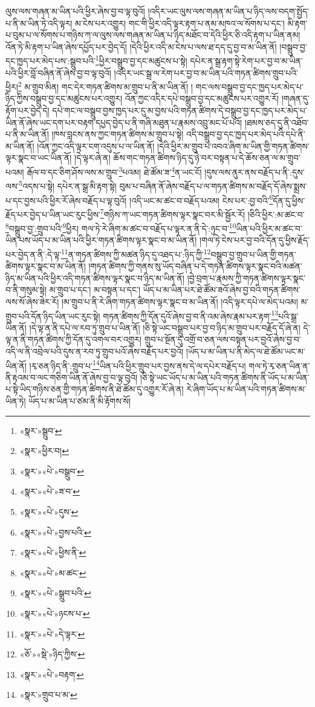 ལུས་ལས་གཞན་མ་ཡིན་པའི་ཕྱིར་ཞེས་བྱ་བ་ལྟ་བུའོ། །འདིར་ཡང་ལུས་ལས་གཞན་མ་ཡིན་པ་ཉིད་ལས་བདག་སྤྱོད་པ་ནི་མ་ཡིན་ཏེ་འདི་ལྟར། མ་ངེས་པར་འགྱུར། གང་གི་ཕྱིར་འདི་ལྟར་རྟག་པ་ནམ་མཁའ་ལ་སོགས་པ་དང་། མི་རྟག་པ་བུམ་པ་ལ་སོགས་པ་གཉིས་ཀ་ལ་ལུས་ལས་གཞན་མ་ཡིན་པ་ཉིད་མཐོང་བ་དེའི་ཕྱིར་ཅི་འདི་རྟག་པ་ཡིན་ནམ། འོན་ཏེ་མི་རྟག་པ་ཡིན་ཞེས་དཔྱོད་པར་བྱེད་དོ། །དེའི་ཕྱིར་འདི་མ་ངེས་པ་ལས་ཐ་དད་དུ་བྱ་བ་མ་ཡིན་ནོ། །བསྒྲུབ་བྱ་དང་ཁྱད་པར་མེད་པས་:སྒྲུབ་པའི་\footnote{«སྣར་»སྒྲུབ་}ཕྱིར་བསྒྲུབ་བྱ་དང་མཚུངས་པ་སྟེ། དཔེར་ན་སྒྲ་རྟག་སྟེ་རེག་པར་བྱ་བ་མ་ཡིན་པའི་ཕྱིར་བློ་བཞིན་ནོ་ཞེས་བྱ་བ་ལྟ་བུའོ། །འདིར་ཡང་སྒྲ་ལ་རེག་པར་བྱ་བ་མ་ཡིན་པའི་གཏན་ཚིགས་གྲུབ་པའི་ཕྱིར།\footnote{«སྣར་»ཕྱིར་བ།} མ་གྲུབ་མིན། གང་དེར་གཏན་ཚིགས་མ་གྲུབ་པ་ནི་མ་ཡིན་ནོ། །
གང་ལས་བསྒྲུབ་བྱ་དང་ཁྱད་པར་མེད་པ་ཉིད་ཀྱིས་བསྒྲུབ་བྱ་དང་མཚུངས་པར་འགྱུར། འོན་ཀྱང་འདིར་དཔེ་བསྒྲུབ་བྱ་དང་མཚུངས་པར་འགྱུར་རོ། །གཞན་དུ་རྟོག་པར་བྱེད་དེ། དཔེ་གང་ལ་བསྒྲུབ་བྱས་ཁྱད་པར་དུ་མ་བྱས་པའི་གཏན་ཚིགས་དེ་བསྒྲུབ་བྱ་དང་ཁྱད་པར་མེད་པ་ཡིན་ནོ་ཞེས་ཡང་དག་པར་བརྟག་དཔྱད་བྱེད་པ་ནི་གཞི་མཐུན་པ་རྣམས་འབྲུ་མང་པོ་པའོ། །ཐམས་ཅད་དུ་ནི་འཐོབ་པ་ནི་མ་ཡིན་ནོ། །ཁས་བླངས་ནས་ཀྱང་གཏན་ཚིགས་མ་གྲུབ་པ་སྟེ། འདི་བསྒྲུབ་བྱ་དང་ཁྱད་པར་མེད་པའི་དཔེ་ནི་མ་ཡིན་ནོ། །འོན་ཀྱང་འདི་ལྟར་ངག་འདུས་པ་ལ་ཡིན་ནོ། །དེའི་ཕྱིར་མ་གྲུབ་པ་འབའ་ཞིག་མ་ཡིན་གྱི་གཏན་ཚིགས་ལྟར་སྣང་བ་ཡང་ཡིན་ནོ། །དེ་ལྟར་ཞེ་ན། ཆོས་གང་གཏན་ཚིགས་ཉིད་དུ་ཉེ་བར་བསྟན་པ་དེ་ཆོས་ཅན་ལ་མ་གྲུབ་པའམ། རྒོལ་བ་དང་ཅིག་ཤོས་ལས་མ་གྲུབ་\footnote{«སྣར་»«པེ་»བསྒྲུབ་}པའམ། ཐེ་ཚོམ་ཟ་\footnote{«སྣར་»«པེ་»ཟ་བ་}ན་ཡང་ངོ། །དུས་ལས་ནུར་ནས་བརྗོད་པ་ནི་:དུས་ལས་\footnote{«སྣར་»«པེ་»དུས་}འདས་པ་སྟེ། དཔེར་ན་སྒྲ་མི་རྟག་སྟེ། བུམ་པ་བཞིན་ནོ་ཞེས་བརྗོད་པ་ལ་གཏན་ཚིགས་མ་བརྗོད་དོ་ཞེས་སྨྲས་པ་དང་བྱས་པའི་ཕྱིར་རོ་ཞེས་བརྗོད་པ་ལྟ་བུའོ། །འདི་ཡང་མ་ཚང་བ་བརྗོད་པའམ། ངེས་པར་:བྱ་བའི་\footnote{«སྣར་»«པེ་»བྱས་པའི་}དོན་དུ་ཕྱིས་རྗོད་པར་བྱེད་པ་ཡིན་ཡང་རུང་ཕྱིས་\footnote{«སྣར་»«པེ་»ཕྱིས་ནི་}གཉིས་ཀ་ཡང་གཏན་ཚིགས་ལྟར་སྣང་བར་མི་སྦྱོར་རོ། །ཅིའི་ཕྱིར་:མ་ཚང་བ་\footnote{«སྣར་»«པེ་»མ་ཚང་}བསྒྲུབ་བྱ་:གྲུབ་པའི་\footnote{«སྣར་»«པེ་»སྒྲུབ་པའི་}ཕྱིར། གལ་ཏེ་རེ་ཞིག་མ་ཚང་བ་བརྗོད་པ་ལྟར་ན་ནི་དེ་:ཉུང་བ་\footnote{«སྣར་»«པེ་»ཉངས་པ་}ཡིན་པའི་ཕྱིར་མ་ཚང་བ་ཡིན་པས་ཡོད་པ་མ་ཡིན་པའི་ཕྱིར་གཏན་ཚིགས་ལྟར་སྣང་བ་མ་ཡིན་ནོ། །གལ་ཏེ་ངེས་པར་བྱ་བའི་དོན་དུ་ཕྱིས་རྗོད་པར་བྱེད་ན་ནི་:དེ་ལྟ་\footnote{«སྣར་»«པེ་»དེ་ལྟར་}ན་གཏན་ཚིགས་ཀྱི་མཚན་ཉིད་དུ་འཐད་པ་:ཉིད་ཀྱི་\footnote{«ཅོ་»«སྡེ་»ཉིད་ཀྱིས་}བསྒྲུབ་བྱ་གྲུབ་པ་ཡིན་གྱི་གཏན་ཚིགས་ལྟར་སྣང་བ་མ་ཡིན་ནོ། །གཏན་ཚིགས་ཀྱི་གནས་སུ་ཡོད་བཞིན་པ་དེ་གཏན་ཚིགས་ལྟར་སྣང་བའི་མཚན་ཉིད་མ་ཡིན་པའི་ཕྱིར་འདི་གཏན་ཚིགས་ལྟར་སྣང་བ་ཉིད་མ་ཡིན་ནོ། །བྱེ་བྲག་པ་རྣམས་ཀྱི་གཏན་ཚིགས་ལྟར་སྣང་བ་ནི་གསུམ་སྟེ། མ་གྲུབ་པ་དང་། མ་བསྟན་པ་དང་། ཡོད་པ་མ་ཡིན་པར་ཐེ་ཚོམ་ཟའོ་ཞེས་བྱ་བའི་གཏན་ཚིགས་ལས་སོ་ཞེས་ཟེར་རོ། །མ་གྲུབ་པ་ནི་རེ་ཞིག་གཏན་ཚིགས་ལྟར་སྣང་བ་མ་ཡིན་ནོ། །འདི་ལྟར་དཔེ་ལ་མེད་པའམ། མ་གྲུབ་པའི་དོན་ཉིད་ཡིན་ཡང་རུང་སྟེ། གཏན་ཚིགས་ཀྱི་དོན་དུའོ་ཞེས་བྱ་བ་ནི་འམ་ཞེས་རྣམ་པར་རྟག་\footnote{«སྣར་»«པེ་»བརྟག་}པའི་སྒྲ་ཡིན་ནོ། །དེ་ལྟ་ན་ནི་དཔེ་ལ་རབ་ཏུ་གྲུབ་པ་ཡིན་ནོ། །ཅི་སྟེ་ཡང་བསྒྲུབ་པར་བྱ་བ་ཉིད་མ་གྲུབ་པར་བརྗོད་དོ་ཞེ་ན། དེ་ལྟ་ན་ནི་གཏན་ཚིགས་ཀྱི་དོན་དུ་འགལ་བར་འགྱུར། གྲུབ་པ་སྔོན་དུ་འགྲོ་བ་ཅན་ལས་བསྟན་པར་བྱའོ་ཞེས་བྱ་བ་འདི་ལ་ནི་འབྲེལ་པའི་དུས་ན་རབ་ཏུ་གྲུབ་པའོ་ཞེས་བརྗོད་པར་བྱའོ། །ཡོད་པ་མ་ཡིན་པ་ནི་མེད་ལ་ཐེ་ཚོམ་ཡང་མ་ཡིན་ནོ། །རྭ་ཅན་ཉིད་ནི་:གྲུབ་པ་\footnote{«སྣར་»གྲུབ་པ་མ་}ཡིན་པའི་ཕྱིར་གྲུབ་པར་བྱས་ནས་དེ་ལ་དཔེར་བརྗོད་པ། གལ་ཏེ་རྭ་ཅན་ཡིན་ན་ནི་རྟའམ་བ་ལང་གཅིག་ཡིན་ནོ་ཞེས་བྱ་བ་ལྟ་བུའོ། །ཅི་སྟེ་ཡང་ཡོད་པ་མ་ཡིན་པའི་གཏན་ཚིགས་ནི་ཡོད་པ་མ་ཡིན་པ་སྟེ་ཡིད་གཉིས་ཅན་གྱི་གཏན་ཚིགས་ནི་ཐེ་ཚོམ་དུ་འགྱུར་རོ་ཞེ་ན། རེ་ཞིག་ཡོད་པ་མ་ཡིན་པའི་གཏན་ཚིགས་མ་ཡིན་ཏེ། ཡོད་པ་མ་ཡིན་པ་ཙམ་ནི་མི་རྟོགས་སོ། 